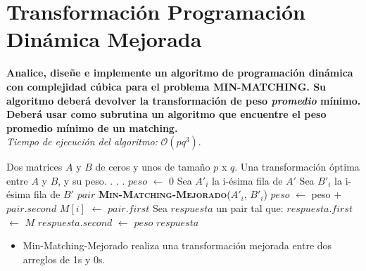 \documentclass[12pt,a4,paper]{article}
\begin{document}
\section{Transformación Programación Dinámica Mejorada}

\textbf{Analice, diseñe e implemente un algoritmo de programación dinámica con complejidad cúbica para el problema \textsc{MIN-MATCHING}. Su algoritmo deberá devolver la transformación de peso \textit{promedio} mínimo. Deberá usar como subrutina un algoritmo que encuentre el peso promedio mínimo de un matching.} \\

\textit{Tiempo de ejecuci\'on del algoritmo:} $\mathcal{O}(pq^{3})$.\newline

\begin{algorithmic}[1]
    \REQUIRE Dos matrices $A$ y $B$ de ceros y unos de tamaño $p$ x $q$.
    \ENSURE Una transformación óptima entre $A$ y $B$, y su peso.\newline\newline
        .
    .
    .
    \STATE
    \STATE $peso$ $\gets$ $0$
    \STATE
        \STATE Sea $A'_i$ la i-ésima fila de $A'$
        \STATE Sea $B'_i$ la i-ésima fila de $B'$
        \STATE $pair$ \gets \textbf{\textsc{Min-Matching-Mejorado}}($A'_i$, $B'_i$)
        \STATE $peso$ $\gets$ peso $+$ $pair.second$
        \STATE $M[i]$ $\gets$ $pair.first$
    \ENDFOR
    \STATE
    \STATE Sea $respuesta$ un pair tal que:
    \STATE $respuesta.first$ $\gets$ $M$
    \STATE $respuesta.second$ $\gets$ $peso$
    \STATE
    \RETURN $respuesta$
\end{algorithmic}

\begin{itemize}
    \item Min-Matching-Mejorado realiza una transformaci\'on mejorada entre dos arreglos de 1s y 0s.
\end{itemize}
\end{document}
